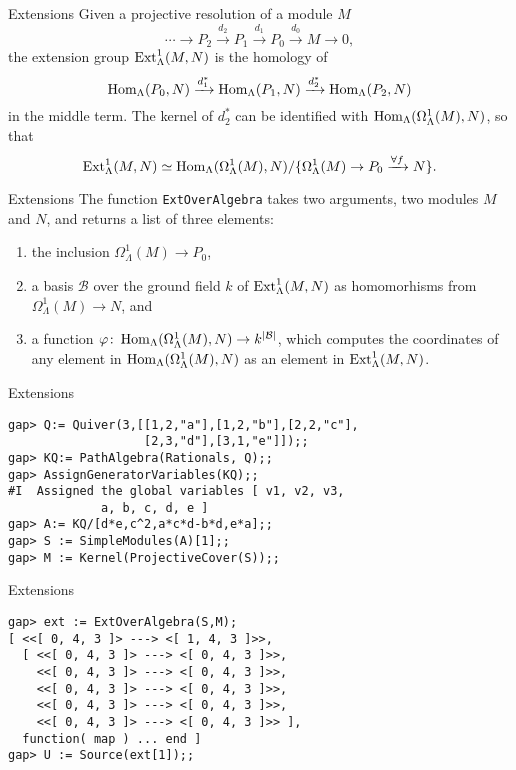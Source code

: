 \begin{frame}{Extensions}
Given a projective resolution of a module $M$ 
\[\cdots\to P_2\xrightarrow{d_2} P_1\xrightarrow{d_1}
P_0\xrightarrow{d_0} M\to 0,\]
the extension group $\operatorname{Ext}\nolimits^1_\Lambda(M,N)$ is the homology 
of 
\[\operatorname{Hom}\nolimits_\Lambda(P_0,N)\xrightarrow{d_1^*} \operatorname{Hom}\nolimits_\Lambda(P_1,N)
\xrightarrow{d_2^*} \operatorname{Hom}\nolimits_\Lambda(P_2,N)
\]
in the middle term.  The kernel of $d_2^*$ can be identified with
$\operatorname{Hom}\nolimits_\Lambda(\Omega^1_\Lambda(M),N)$, so that 
\[\operatorname{Ext}\nolimits^1_\Lambda(M,N)\simeq \operatorname{Hom}\nolimits_\Lambda(\Omega^1_\Lambda(M),N)/\{
\Omega^1_\Lambda(M)\to P_0\xrightarrow{\forall f} N\}.\]  
\end{frame}

\begin{frame}{Extensions}
The function \texttt{ExtOverAlgebra} takes two arguments, two modules
$M$ and $N$, and returns a list of three elements: 
\begin{enumerate}[\rm(1)]
\item the inclusion $\Omega^1_\Lambda(M)\to P_0$, 
\item a basis $\mathcal{B}$ over the ground field $k$ of
  $\operatorname{Ext}\nolimits^1_\Lambda(M,N)$ as homomorhisms from $\Omega^1_\Lambda(M)\to
  N$, and 
\item a function $\varphi\colon \operatorname{Hom}\nolimits_\Lambda(\Omega^1_\Lambda(M),N)
  \to k^{|\mathcal{B}|}$, which computes the coordinates of any
  element in $\operatorname{Hom}\nolimits_\Lambda(\Omega^1_\Lambda(M),N)$  as an element in 
$\operatorname{Ext}\nolimits^1_\Lambda(M,N)$. 
\end{enumerate}
\end{frame}

\begin{frame}[fragile]{Extensions}
\begin{verbatim}
gap> Q:= Quiver(3,[[1,2,"a"],[1,2,"b"],[2,2,"c"],
                   [2,3,"d"],[3,1,"e"]]);;
gap> KQ:= PathAlgebra(Rationals, Q);;
gap> AssignGeneratorVariables(KQ);;
#I  Assigned the global variables [ v1, v2, v3, 
             a, b, c, d, e ]
gap> A:= KQ/[d*e,c^2,a*c*d-b*d,e*a];;
gap> S := SimpleModules(A)[1];;
gap> M := Kernel(ProjectiveCover(S));;
\end{verbatim}
\end{frame}

\begin{frame}[fragile]{Extensions}
\begin{verbatim}
gap> ext := ExtOverAlgebra(S,M);
[ <<[ 0, 4, 3 ]> ---> <[ 1, 4, 3 ]>>, 
  [ <<[ 0, 4, 3 ]> ---> <[ 0, 4, 3 ]>>,
    <<[ 0, 4, 3 ]> ---> <[ 0, 4, 3 ]>>, 
    <<[ 0, 4, 3 ]> ---> <[ 0, 4, 3 ]>>,
    <<[ 0, 4, 3 ]> ---> <[ 0, 4, 3 ]>>, 
    <<[ 0, 4, 3 ]> ---> <[ 0, 4, 3 ]>> ],
  function( map ) ... end ]
gap> U := Source(ext[1]);;
\end{verbatim}
\end{frame}

